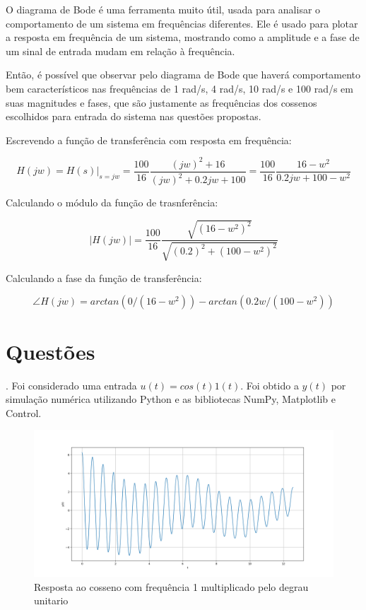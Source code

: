 \documentclass[10pt]{article}
\begin{document}
\quad O diagrama de Bode é uma ferramenta muito útil,
usada para analisar o comportamento de um sistema em frequências diferentes.
Ele é usado para plotar a resposta em frequência de um sistema,
mostrando como a amplitude e a fase de um sinal de entrada mudam em relação à frequência.

\quad Então, é possível que observar pelo diagrama de Bode que haverá comportamento bem característicos nas frequências de 1 rad/s,
4 rad/s, 10 rad/s e 100 rad/s em suas magnitudes e fases,
que são justamente as frequências dos cossenos escolhidos para entrada do sistema nas questões propostas.

\quad Escrevendo a função de transferência com resposta em frequência:

\begin{equation}
    H(jw) = H(s)|_{s=jw} = \frac{100}{16} \frac{(jw)^2 + 16}{(jw)^2 + 0.2jw + 100} = \frac{100}{16} \frac{16 - w^2}{0.2jw + 100 - w^2}
\end{equation}

\quad Calculando o módulo da função de trasnferência:

\begin{equation}
    |H(jw)| = \frac{100}{16} \frac{\sqrt{(16 - w^2)^2}}{\sqrt{(0.2)^2 + (100 - w^2)^2}}
\end{equation}

\quad Calculando a fase da função de transferência:

\begin{equation}
    \angle H(jw) = arctan(0/(16 - w^2)) - arctan(0.2w/(100 - w^2))
\end{equation}

\newpage

\section{Questões}

. Foi considerado uma entrada $u(t) = cos(t) 1(t)$. Foi obtido a $y(t)$ por simulação numérica utilizando Python
e as bibliotecas NumPy, Matplotlib e Control.

\begin{figure}[h]
    \centering
    \includegraphics[scale=0.45]{questao1.png}
    \caption{Resposta ao cosseno com frequência 1 multiplicado pelo degrau unitario}
\end{figure}
\end{document}
